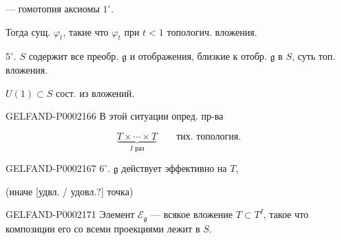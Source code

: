 --- гомотопия аксиомы $1^{\circ}$.



Тогда сущ. $\varphi_t$, такие что $\varphi_t$ при $t<1$ топологич. вложения.



$5^{\circ}$. $S$ содержит все преобр. $\mathfrak g$ и отображения,
близкие к отобр. $\mathfrak g$ в $S$, суть топ. вложения.



$U(1)\subset S$ сост. из вложений.



\begin{GelfandAdjacentEvidence}{GELFAND-P000216}{6}
В этой ситуации опред. пр-ва






\end{GelfandAdjacentEvidence}





\begin{equation*}\underbrace{T\times\cdots\times T}_{I\text{ раз}}\qquad\text{тих. топология.}\end{equation*}



\begin{GelfandAdjacentEvidence}{GELFAND-P000216}{7}
$6^{\circ}$. $\mathfrak g$ действует эффективно на $T$,



(иначе [удвл. / удовл.?] точка)
\end{GelfandAdjacentEvidence}



\begin{GelfandAdjacentEvidence}{GELFAND-P000217}{1}
Элемент $\mathcal E_{\mathfrak g}$ --- всякое вложение $T\subset T^I$, такое
что композиции его со всеми проекциями лежит в $S$.
\end{GelfandAdjacentEvidence}

